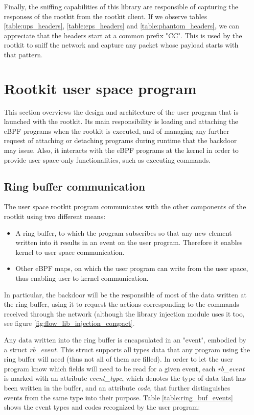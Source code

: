 Finally, the sniffing capabilities of this library are responsible of capturing the responses of the rootkit from the rootkit client. If we observe tables \ref{table:ups_headers}, \ref{table:eps_headers} and \ref{table:phantom_headers}, we can appreciate that the headers start at a common prefix "CC". This is used by the rootkit to sniff the network and capture any packet whose payload starts with that pattern.



\section{Rootkit user space program}
This section overviews the design and architecture of the user program that is launched with the rootkit. Its main responsibility is loading and attaching the eBPF programs when the rootkit is executed, and of managing any further request of attaching or detaching programs during runtime that the backdoor may issue. Also, it interacts with the eBPF programs at the kernel in order to provide user space-only functionalities, such as executing commands. 

\subsection{Ring buffer communication}
The user space rootkit program communicates with the other components of the rootkit using two different means:
\begin{itemize}
\item A ring buffer, to which the program subscribes so that any new element written into it results in an event on the user program. Therefore it enables kernel to user space communication.
\item Other eBPF maps, on which the user program can write from the user space, thus enabling user to kernel communication.
\end{itemize}

In particular, the backdoor will be the responsible of most of the data written at the ring buffer, using it to request the actions corresponding to the commands received through the network (although the library injection module uses it too, see figure \ref{fig:flow_lib_injection_compact}. 

Any data written into the ring buffer is encapsulated in an "event", embodied by a struct \textit{rb\_event}. This struct supports all types data that any program using the ring buffer will need (thus not all of them are filled). In order to let the user program know which fields will need to be read for a given event, each \textit{rb\_event} is marked with an attribute \textit{event\_type}, which denotes the type of data that has been written in the buffer, and an attribute \textit{code}, that further distinguishes events from the same type into their purpose. Table \ref{table:ring_buf_events} shows the event types and codes recognized by the user program:

